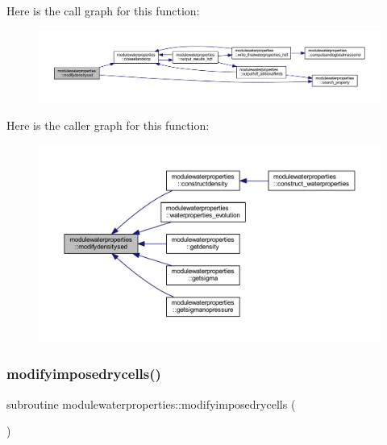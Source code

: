 Here is the call graph for this function\+:\nopagebreak
\begin{figure}[H]
\begin{center}
\leavevmode
\includegraphics[width=350pt]{namespacemodulewaterproperties_a430bfd6acd72693785ebf7d3e3a9dea8_cgraph}
\end{center}
\end{figure}
Here is the caller graph for this function\+:\nopagebreak
\begin{figure}[H]
\begin{center}
\leavevmode
\includegraphics[width=350pt]{namespacemodulewaterproperties_a430bfd6acd72693785ebf7d3e3a9dea8_icgraph}
\end{center}
\end{figure}
\mbox{\label{namespacemodulewaterproperties_aaeed6e345543d58d8feee181656796d0}} 
\subsubsection{\texorpdfstring{modifyimposedrycells()}{modifyimposedrycells()}}
{\footnotesize\ttfamily subroutine modulewaterproperties\+::modifyimposedrycells (\begin{DoxyParamCaption}{ }\end{DoxyParamCaption})\hspace{0.3cm}{\ttfamily [private]}}

